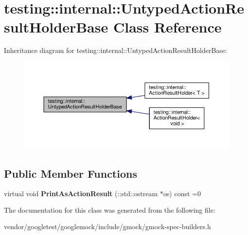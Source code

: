 \hypertarget{classtesting_1_1internal_1_1UntypedActionResultHolderBase}{}\section{testing\+:\+:internal\+:\+:Untyped\+Action\+Result\+Holder\+Base Class Reference}
\label{classtesting_1_1internal_1_1UntypedActionResultHolderBase}


Inheritance diagram for testing\+:\+:internal\+:\+:Untyped\+Action\+Result\+Holder\+Base\+:\nopagebreak
\begin{figure}[H]
\begin{center}
\leavevmode
\includegraphics[width=350pt]{classtesting_1_1internal_1_1UntypedActionResultHolderBase__inherit__graph}
\end{center}
\end{figure}
\subsection*{Public Member Functions}
\begin{DoxyCompactItemize}
\item 
virtual void {\bfseries Print\+As\+Action\+Result} (\+::std\+::ostream $\ast$os) const =0\hypertarget{classtesting_1_1internal_1_1UntypedActionResultHolderBase_a4b4a558fcb1d3b02c0fec34f186d3b90}{}\label{classtesting_1_1internal_1_1UntypedActionResultHolderBase_a4b4a558fcb1d3b02c0fec34f186d3b90}

\end{DoxyCompactItemize}


The documentation for this class was generated from the following file\+:\begin{DoxyCompactItemize}
\item 
vendor/googletest/googlemock/include/gmock/gmock-\/spec-\/builders.\+h\end{DoxyCompactItemize}
